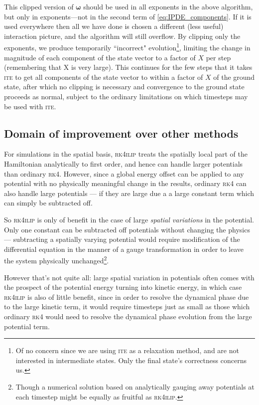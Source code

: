 This clipped version of $\mathbf{\omega}$ should be used in all exponents in the above algorithm, but only in exponents---not in the second term of \eqref{eq:IPDE_components}. If it is used everywhere then all we have done is chosen a different (less useful) interaction picture, and the algorithm will still overflow. By clipping only the exponents, we produce temporarily ``incorrect" evolution\footnote{Of no concern since we are using \textsc{ite} as a relaxation method, and are not interested in intermediate states. Only the final state's correctness concerns us.}, limiting the change in magnitude of each component of the state vector to a factor of $X$ per step (remembering that X is very large). This continues for the few steps that it takes \textsc{ite} to get all components of the state vector to within a factor of $X$ of the ground state, after which no clipping is necessary and convergence to the ground state proceeds as normal, subject to the ordinary limitations on which timesteps may be used with \textsc{ite}.

\subsection{Domain of improvement over other methods}

 For simulations in the spatial basis, \textsc{rk4ilip} treats the spatially local part of the Hamiltonian analytically to first order, and hence can handle larger potentials than ordinary \textsc{rk4}. However, since a global energy offset can be applied to any potential with no physically meaningful change in the results, ordinary \textsc{rk4} can also handle large potentials --- if they are large due a a large constant term which can simply be subtracted off.

So \textsc{rk4ilip} is only of benefit in the case of large \emph{spatial variations} in the potential. Only one constant can be subtracted off potentials without changing the physics --- subtracting a spatially varying potential would require modification of the differential equation in the manner of a gauge transformation in order to leave the system physically unchanged\footnote{Though a numerical solution based on analytically gauging away potentials at each timestep might be equally as fruitful as \textsc{rk4ilip}.}.

However that's not quite all: large spatial variation in potentials often comes with the prospect of the potential energy turning into kinetic energy, in which case \textsc{rk4ilip} is also of little benefit, since in order to resolve the dynamical phase due to the large kinetic term, it would require timesteps just as small as those which ordinary \textsc{rk4} would need to resolve the dynamical phase evolution from the large potential term.

